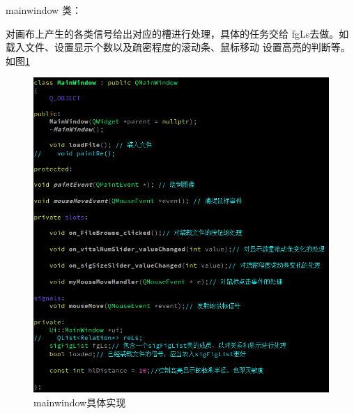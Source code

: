\documentclass[a4paper,UTF8]{article}
\numberwithin{equation}{section}
\begin{document}
\par mainwindow 类：
\par 对画布上产生的各类信号给出对应的槽进行处理，具体的任务交给
fgLs去做。如载入文件、设置显示个数以及疏密程度的滚动条、鼠标移动
设置高亮的判断等。如图\ref{task6-mainwindow}
\begin{figure}[htbp]
    \centering
    \includegraphics[width = 15cm]{task6-mainwindow.png}
    \caption{mainwindow具体实现}
    \label{task6-mainwindow}
\end{figure}
\end{document}
